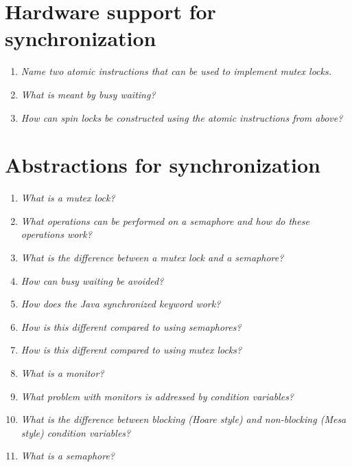 \documentclass[a4paper]{article}
\begin{document}
\section{Hardware support for synchronization}
\begin{enumerate}
  \item  \textit{Name two atomic instructions that can be used to implement mutex locks. }\\
  \item \textit{ What is meant by busy waiting? }\\
  \item \textit{ How can spin locks be constructed using the atomic instructions from above? }\\
\end{enumerate}

\section{Abstractions for synchronization}
\begin{enumerate}
  \item \textit{ What is a mutex lock? }\\
  \item \textit{ What operations can be performed on a semaphore and how do these operations work? }\\
  \item \textit{ What is the difference between a mutex lock and a semaphore? }\\
  \item \textit{ How can busy waiting be avoided? }\\
  \item \textit{ How does the Java synchronized keyword work? }\\
  \item \textit{ How is this different compared to using semaphores? }\\
  \item \textit{ How is this different compared to using mutex locks? }\\
  \item \textit{ What is a monitor? }\\
  \item \textit{ What problem with monitors is addressed by condition variables? }\\
  \item \textit{ What is the difference between blocking (Hoare style) and non-blocking (Mesa style) condition variables? }\\
  \item \textit{ What is a semaphore? }\\
\end{enumerate}
\end{document}
